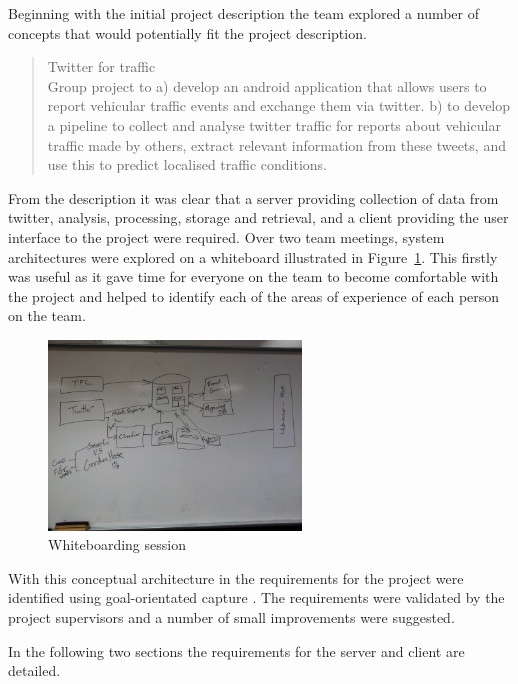 Beginning with the initial project description the team explored a number of
concepts that would potentially fit the project description.

\begin{quote}
Twitter for traffic\\
Group project to a) develop an android application that allows users to report
vehicular traffic events and exchange them via twitter. b) to develop a
pipeline to collect and analyse twitter traffic for reports about vehicular
traffic made by others, extract relevant information from these tweets, and use
this to predict localised traffic conditions.
\end{quote}

From the description it was clear that a server providing collection of data
from twitter, analysis, processing, storage and retrieval, and a client
providing the user interface to the project were required. Over two team
meetings, system architectures were explored on a whiteboard illustrated in
Figure~\ref{fig:whiteboarding_session}. This firstly was useful as it gave time for
everyone on the team to become comfortable with the project and helped to
identify each of the areas of experience of each person on the team.

\begin{figure}[htb]
\centering
\includegraphics[width=0.6\textwidth]{images/specification/whiteboard_session.jpg}
\caption{Whiteboarding session}
\label{fig:whiteboarding_session}
\end{figure}

With this conceptual architecture in the requirements for the project were
identified using goal-orientated capture \cite{dardenne93}. The requirements were validated by
the project supervisors and a number of small improvements were suggested.

In the following two sections the requirements for the server and client are
detailed.

